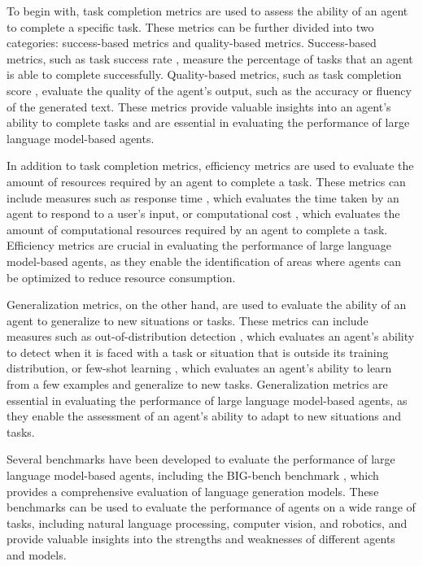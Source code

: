 \documentclass[11pt]{article}
\begin{document}
To begin with, task completion metrics are used to assess the ability of an agent to complete a specific task. These metrics can be further divided into two categories: success-based metrics and quality-based metrics. Success-based metrics, such as task success rate \cite{ref187}, measure the percentage of tasks that an agent is able to complete successfully. Quality-based metrics, such as task completion score \cite{ref188}, evaluate the quality of the agent's output, such as the accuracy or fluency of the generated text. These metrics provide valuable insights into an agent's ability to complete tasks and are essential in evaluating the performance of large language model-based agents.

In addition to task completion metrics, efficiency metrics are used to evaluate the amount of resources required by an agent to complete a task. These metrics can include measures such as response time \cite{ref189}, which evaluates the time taken by an agent to respond to a user's input, or computational cost \cite{ref190}, which evaluates the amount of computational resources required by an agent to complete a task. Efficiency metrics are crucial in evaluating the performance of large language model-based agents, as they enable the identification of areas where agents can be optimized to reduce resource consumption.

Generalization metrics, on the other hand, are used to evaluate the ability of an agent to generalize to new situations or tasks. These metrics can include measures such as out-of-distribution detection \cite{ref191}, which evaluates an agent's ability to detect when it is faced with a task or situation that is outside its training distribution, or few-shot learning \cite{ref192}, which evaluates an agent's ability to learn from a few examples and generalize to new tasks. Generalization metrics are essential in evaluating the performance of large language model-based agents, as they enable the assessment of an agent's ability to adapt to new situations and tasks.

Several benchmarks have been developed to evaluate the performance of large language model-based agents, including the BIG-bench benchmark \cite{ref193}, which provides a comprehensive evaluation of language generation models. These benchmarks can be used to evaluate the performance of agents on a wide range of tasks, including natural language processing, computer vision, and robotics, and provide valuable insights into the strengths and weaknesses of different agents and models.
\end{document}

